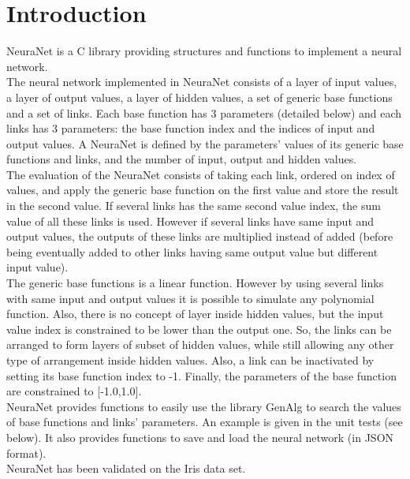 \section*{Introduction}

NeuraNet is a C library providing structures and functions to implement a neural network.\\ 

The neural network implemented in NeuraNet consists of a layer of input values, a layer of output values, a layer of hidden values, a set of generic base functions and a set of links. Each base function has 3 parameters (detailed below) and each links has 3 parameters: the base function index and the indices of input and output values. A NeuraNet is defined by the parameters' values of its generic base functions and links, and the number of input, output and hidden values.\\

The evaluation of the NeuraNet consists of taking each link, ordered on index of values, and apply the generic base function on the first value and store the result in the second value. If several links has the same second value index, the sum value of all these links is used. However if several links have same input and output values, the outputs of these links are multiplied instead of added (before being eventually added to other links having same output value but different input value).\\

The generic base functions is a linear function. However by using several links with same input and output values it is possible to simulate any polynomial function. Also, there is no concept of layer inside hidden values, but the input value index is constrained to be lower than the output one. So, the links can be arranged to form layers of subset of hidden values, while still allowing any other type of arrangement inside hidden values. Also, a link can be inactivated by setting its base function index to -1. Finally, the parameters of the base function are constrained to [-1.0,1.0].\\

NeuraNet provides functions to easily use the library GenAlg to search the values of base functions and links' parameters. An example is given in the unit tests (see below). It also provides functions to save and load the neural network (in JSON format).\\

NeuraNet has been validated on the Iris data set.\\

